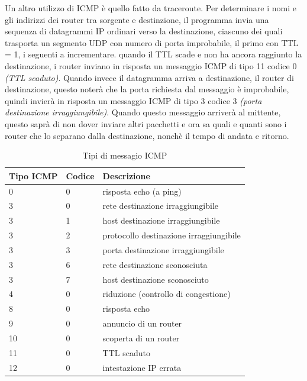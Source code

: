 \documentclass[11pt,a4paper]{article}
\begin{document}
Un altro utilizzo di ICMP è quello fatto da traceroute. Per determinare i nomi e gli indirizzi dei router tra sorgente e destinzione, il programma invia una sequenza di datagrammi IP ordinari verso la destinazione, ciascuno dei quali trasporta un  segmento UDP con numero di porta improbabile, il primo con TTL = 1, i seguenti a incrementare. quando il TTL scade e non ha ancora raggiunto la destinazione, i router inviano in risposta un messaggio ICMP di tipo 11 codice 0 \textit{(TTL scaduto)}. Quando invece il datagramma arriva a destinazione, il router di destinazione, questo noterà che la porta richiesta dal messaggio è improbabile, quindi invierà in risposta un messaggio ICMP di tipo 3 codice 3 \textit{(porta destinazione irraggiungibile)}. Quando questo messaggio arriverà al mittente, questo saprà di non dover inviare altri pacchetti e ora sa quali e quanti sono i router che lo separano dalla destinazione, nonchè il tempo di andata e ritorno.

\begin{table}[]
	\begin{tabular}{|l|l|l|}
		\hline
		\textbf{Tipo ICMP} & \textbf{Codice} & \textbf{Descrizione}                    \\ \hline
		0                  & 0               & risposta echo (a ping)                  \\ \hline
		3                  & 0               & rete destinazione irraggiungibile       \\ \hline
		3                  & 1               & host destinazione irraggiungibile       \\ \hline
		3                  & 2               & protocollo destinazione irraggiungibile \\ \hline
		3                  & 3               & porta destinazione irraggiungibile      \\ \hline
		3                  & 6               & rete destinazione sconosciuta           \\ \hline
		3                  & 7               & host destinazione sconosciuto           \\ \hline
		4                  & 0               & riduzione (controllo di congestione)    \\ \hline
		8                  & 0               & risposta echo                           \\ \hline
		9                  & 0               & annuncio di un router                   \\ \hline
		10                 & 0               & scoperta di un router                   \\ \hline
		11                 & 0               & TTL scaduto                             \\ \hline
		12                 & 0               & intestazione IP errata                  \\ \hline
	\end{tabular}
	\caption{Tipi di messagio ICMP}
	\label{tab: 001}
\end{table}
\pagebreak
\end{document}
